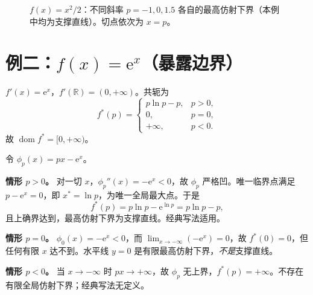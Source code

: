 \documentclass[
    lang=cn,
    color=blue,
    mode=fancy,
    thmcnt=section,
    scheme=chinese,
    chinesefont=ctexfont
]{elegantbook}
\newcommand{\R}{\mathbb{R}}
\newcommand{\e}{\mathrm{e}}
\DeclareMathOperator{\dom}{dom}
\newcommand{\fstar}{f^{\ast}}
\newcommand{\fstarp}{f^{\ast}(p)}
\begin{document}
\begin{figure}[htbp]
\centering
{}
\caption{$f(x)=x^{2}/2$：不同斜率 $p=-1,0,1.5$ 各自的最高仿射下界（本例中均为支撑直线）。切点依次为 $x=p$。}
\label{fig:quad-multi}
\end{figure}


\section{\texorpdfstring{例二：$f(x)=\mathrm{e}^{x}$（暴露边界）}{例二：f(x)=e^x（暴露边界）}}

\begin{example}[$f(x)=\e^{x}$]
$f'(x)=\e^{x}$，$f'(\R)=(0,+\infty)$。共轭为
\[
\fstarp=
\begin{cases}
p\ln p-p,& p>0,\\
0,& p=0,\\
+\infty,& p<0.
\end{cases}
\]
故 $\dom\fstar=[0,+\infty)$。
\end{example}

\begin{solution}
令 $\phi_{p}(x)=px-\e^{x}$。

\textbf{情形 $p>0$。}
对一切 $x$，$\phi_{p}''(x)=-\e^{x}<0$，故 $\phi_{p}$ 严格凹。唯一临界点满足 $p-\e^{x}=0$，即 $x^{\ast}=\ln p$，为唯一全局最大点。于是
\[
\fstarp=p\ln p-\e^{\ln p}=p\ln p-p,
\]
且上确界达到，最高仿射下界为支撑直线。经典写法适用。

\textbf{情形 $p=0$。}
$\phi_{0}(x)=-\e^{x}<0$，而 $\lim_{x\to-\infty}(-\e^{x})=0$，故 $\fstar(0)=0$，但任何有限 $x$ 达不到。水平线 $y=0$ 是有限最高仿射下界，\emph{不是}支撑直线。

\textbf{情形 $p<0$。}
当 $x\to-\infty$ 时 $px\to+\infty$，故 $\phi_{p}$ 无上界，$\fstarp=+\infty$。不存在有限全局仿射下界；经典写法无定义。
\end{solution}
\end{document}
